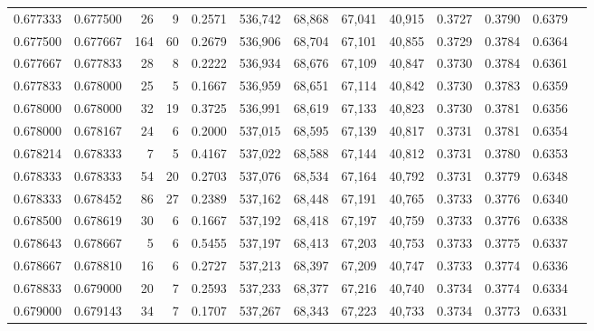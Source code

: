 \begin{tabular}{rrrrrrrrrrrrr}
0.677333 & 0.677500 &    26 &   9 &                                     0.2571 & 536,742 &  68,868 &  67,041 &  40,915 & 0.3727 & 0.3790 & 0.6379 \\
0.677500 & 0.677667 &   164 &  60 &                                     0.2679 & 536,906 &  68,704 &  67,101 &  40,855 & 0.3729 & 0.3784 & 0.6364 \\
0.677667 & 0.677833 &    28 &   8 &                                     0.2222 & 536,934 &  68,676 &  67,109 &  40,847 & 0.3730 & 0.3784 & 0.6361 \\
0.677833 & 0.678000 &    25 &   5 &                                     0.1667 & 536,959 &  68,651 &  67,114 &  40,842 & 0.3730 & 0.3783 & 0.6359 \\
0.678000 & 0.678000 &    32 &  19 &                                     0.3725 & 536,991 &  68,619 &  67,133 &  40,823 & 0.3730 & 0.3781 & 0.6356 \\
0.678000 & 0.678167 &    24 &   6 &                                     0.2000 & 537,015 &  68,595 &  67,139 &  40,817 & 0.3731 & 0.3781 & 0.6354 \\
0.678214 & 0.678333 &     7 &   5 &                                     0.4167 & 537,022 &  68,588 &  67,144 &  40,812 & 0.3731 & 0.3780 & 0.6353 \\
0.678333 & 0.678333 &    54 &  20 &                                     0.2703 & 537,076 &  68,534 &  67,164 &  40,792 & 0.3731 & 0.3779 & 0.6348 \\
0.678333 & 0.678452 &    86 &  27 &                                     0.2389 & 537,162 &  68,448 &  67,191 &  40,765 & 0.3733 & 0.3776 & 0.6340 \\
0.678500 & 0.678619 &    30 &   6 &                                     0.1667 & 537,192 &  68,418 &  67,197 &  40,759 & 0.3733 & 0.3776 & 0.6338 \\
0.678643 & 0.678667 &     5 &   6 &                                     0.5455 & 537,197 &  68,413 &  67,203 &  40,753 & 0.3733 & 0.3775 & 0.6337 \\
0.678667 & 0.678810 &    16 &   6 &                                     0.2727 & 537,213 &  68,397 &  67,209 &  40,747 & 0.3733 & 0.3774 & 0.6336 \\
0.678833 & 0.679000 &    20 &   7 &                                     0.2593 & 537,233 &  68,377 &  67,216 &  40,740 & 0.3734 & 0.3774 & 0.6334 \\
0.679000 & 0.679143 &    34 &   7 &                                     0.1707 & 537,267 &  68,343 &  67,223 &  40,733 & 0.3734 & 0.3773 & 0.6331 \\

\end{tabular}
